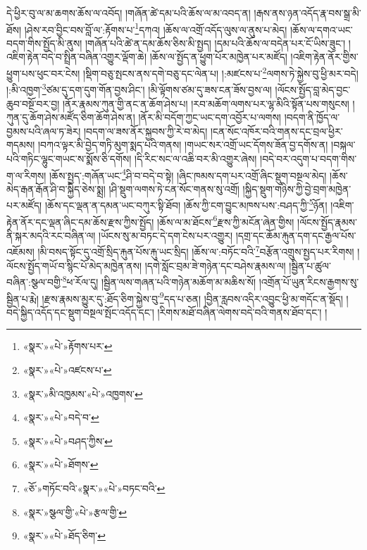 དེ་ཕྱིར་བུ་ལ་མ་ཆགས་ཆོས་ལ་འབོད། །གཞོན་ཚེ་དམ་པའི་ཆོས་ལ་མ་འབད་ན། །རྒས་ནས་ཉན་འདོད་རྣ་བས་སྒྲ་མི་ཐོས། །ཤེས་རབ་བྱིང་བས་བློ་ལ་:རྟོགས་པ་\footnote{«སྣར་»«པེ་»རྟོགས་པར་}དཀའ། །ཆོས་ལ་འགྲོ་འདོད་ལུས་ལ་ནུས་པ་མེད། །ཆོས་ལ་དགའ་ཡང་བདག་གིས་སྤྱོད་མི་ནུས། །གཞོན་པའི་ཚེ་ན་དམ་ཆོས་ཅིས་མི་སྤྱད། །དམ་པའི་ཆོས་ལ་བདེན་པར་ངོ་ཡིས་ཟུང་། །འཇིག་རྟེན་བདེ་བ་སྤྲིན་བཞིན་འགྱུར་ལྡོག་ཆེ། །ཆོས་ལ་སྤྱོད་ན་ཕྱུག་པོར་མཁྱེན་པར་མཛོད། །འཇིག་རྟེན་ནོར་གྱིས་ཕྱུག་པས་ཕུང་བར་ངེས། །སྡིག་བཅུ་སྤངས་ནས་དགེ་བཅུ་དང་ལེན་པ། །:མཛངས་པ་\footnote{«སྣར་»«པེ་»འཛངས་པ་}ལགས་ཏེ་སྐྱེས་བུ་ཕྱི་མར་བདེ། །:མི་འཁྱག་\footnote{«སྣར་»མི་འཁྱམས་«པེ་»འཁྱགས་}ཙམ་དུ་དག་དུག་གོན་བྱས་ཤིང་། །མི་ལྟོགས་ཙམ་དུ་ཟས་ངན་ཟོས་བྱས་ལ། །ལོངས་སྤྱོད་བླ་མེད་བྱང་ཆུབ་བསྔོ་བར་བྱ། །ནོར་རྣམས་ཀུན་གྱི་ནང་ན་ཆོག་ཤེས་པ། །རབ་མཆོག་ལགས་པར་ལྷ་མིའི་སྟོན་པས་གསུངས། །ཀུན་དུ་ཆོག་ཤེས་མཛོད་ཅིག་ཆོག་ཤེས་ན། །ནོར་མི་བདོག་ཀྱང་ཡང་དག་འབྱོར་པ་ལགས། །བདག་ནི་ཁྱོད་ལ་བྱམས་པའི་ཞལ་ཏ་ཟེར། །བདག་ལ་ཟས་ནོར་སྐྱབས་ཀྱི་རེ་བ་མེད། །ངན་སོང་འཁོར་བའི་གནས་དང་བྲལ་ཕྱིར་གདམས། །བཀའ་ལྟར་མི་བྱེད་གཏི་མུག་སྨད་པའི་གནས། །གཡང་སར་འགྲོ་ཡང་དོགས་ཟོན་བྱ་དགོས་ན། །བསྐལ་པའི་གཏིང་ལྷུང་གཡང་ས་སྨོས་ཅི་དགོས། །དི་རིང་སང་ལ་འཆི་བར་མི་འགྱུར་ཞེས། །བདེ་བར་འདུག་པ་བདག་གིས་ག་ལ་རིགས། །ཆོས་སྤྱད་:གཞོན་ཡང་\footnote{«སྣར་»«པེ་»བདེ་བ་}ཤི་བ་བདེ་བ་སྟེ། །ཞིང་ཁམས་དག་པར་འགྲོ་ཞིང་སྡུག་བསྔལ་མེད། །ཆོས་མེད་རྒན་རྒོན་ཤི་བ་སྐྱིད་ཅེས་སྨྲ། །ཤི་སྡུག་ལགས་ཏེ་ངན་སོང་གནས་སུ་འགྲོ། །སྐྱིད་སྡུག་གཉིས་ཀྱི་བྱེ་བྲག་མཁྱེན་པར་མཛོད། །ཆོས་དང་ལྡན་ན་དམན་ཡང་བཀུར་སྟི་ཐོབ། །ཆོས་ཀྱི་ངག་བྱུང་མཁས་པས་:བཤད་ཀྱི་\footnote{«སྣར་»«པེ་»བཤད་ཀྱིས་}ཉོན། །འཇིག་རྟེན་ནོར་དང་ལྡན་ཞིང་དམ་ཆོས་རྫས་ཀྱིས་སྤྱོད། །ཆོས་ལ་མ་ཐོངས་\footnote{«སྣར་»«པེ་»ཐོགས་}རྫས་ཀྱི་མངོན་ཞེན་གྱིས། །ལོངས་སྤྱོད་རྣམས་ནི་སྐར་མདའི་རང་བཞིན་ལ། །ཡོངས་སུ་མ་བཏང་དེ་དག་ངེས་པར་འགྱུར། །དགྲ་དང་ཆོམ་རྐུན་དག་དང་རྒྱལ་པོས་འཇོམས། །མི་བསད་སྟོང་དུ་འགྲོ་སྲིད་རྐུན་པོས་རྐུ་ཡང་སྲིད། །ཆོས་ལ་:བཏོང་བའི་\footnote{«ཅོ་»གཏོང་བའི་«སྣར་»«པེ་»བཏང་བའི་}བརྩོན་འགྲུས་སྤྱད་པར་རིགས། །ལོངས་སྤྱོད་གཡོ་བ་སྙིང་པོ་མེད་མཁྱེན་ནས། །དགེ་སློང་བྲམ་ཟེ་གཉེན་དང་བཤེས་རྣམས་ལ། །སྦྱིན་པ་ཚུལ་བཞིན་:སྩལ་བགྱི་\footnote{«སྣར་»སྩལ་གྱི་«པེ་»རྩལ་གྱི་}ཕ་རོལ་དུ། །སྦྱིན་ལས་གཞན་པའི་གཉེན་མཆོག་མ་མཆིས་སོ། །འགྲོན་པོ་ཡུན་རིངས་རྒྱགས་སུ་སྦྱིན་པ་རྨེ། །རྫས་རྣམས་མྱུར་དུ་:ཐོད་ཅིག་སྐྱེས་བུ་\footnote{«སྣར་»«པེ་»ཐོད་ཅིག་}དད་པ་ཅན། །བྱིན་རླབས་འདིར་འབྱུང་ཕྱི་མ་གདོང་ན་སྡོད། །བདེ་སྐྱིད་འདོད་དང་སྡུག་བསྔལ་སྤོང་འདོད་དང་། །རིགས་མཐོ་བཞིན་ལེགས་བདེ་བའི་གནས་ཐོབ་དང་། །
